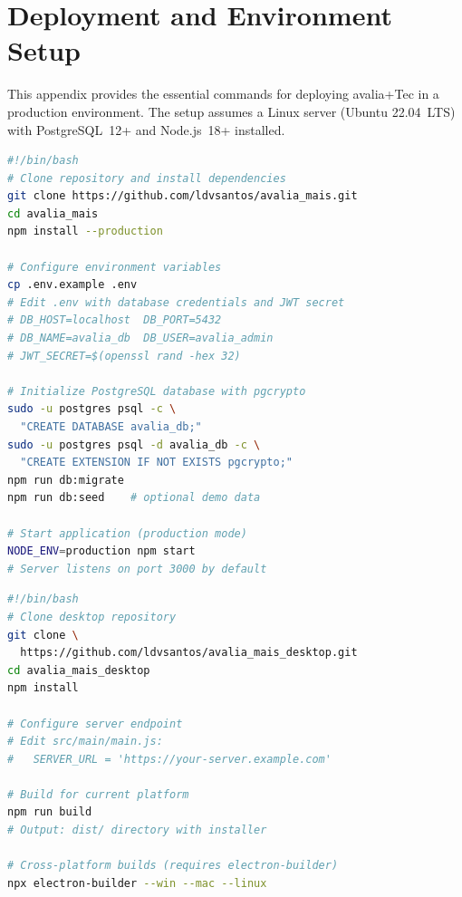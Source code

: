 \documentclass[preprint,12pt,a4paper]{elsarticle}
\begin{document}
\appendix

\section{Deployment and Environment Setup}
\label{app:deployment}

This appendix provides the essential commands for deploying avalia+Tec in a production environment. The setup assumes a Linux server (Ubuntu 22.04~LTS) with PostgreSQL~12+ and Node.js~18+ installed.

\begin{lstlisting}[language=sh, caption={Server-side deployment of the avalia+Tec backend and web portal. The script clones the repository, installs dependencies, configures the database, and starts the application.}, label=lst:deploy]
#!/bin/bash
# Clone repository and install dependencies
git clone https://github.com/ldvsantos/avalia_mais.git
cd avalia_mais
npm install --production

# Configure environment variables
cp .env.example .env
# Edit .env with database credentials and JWT secret
# DB_HOST=localhost  DB_PORT=5432
# DB_NAME=avalia_db  DB_USER=avalia_admin
# JWT_SECRET=$(openssl rand -hex 32)

# Initialize PostgreSQL database with pgcrypto
sudo -u postgres psql -c \
  "CREATE DATABASE avalia_db;"
sudo -u postgres psql -d avalia_db -c \
  "CREATE EXTENSION IF NOT EXISTS pgcrypto;"
npm run db:migrate
npm run db:seed    # optional demo data

# Start application (production mode)
NODE_ENV=production npm start
# Server listens on port 3000 by default
\end{lstlisting}

\begin{lstlisting}[language=sh, caption={Building the Electron desktop application for evaluators. Produces platform-specific installers for Windows, macOS, and Linux.}, label=lst:desktopbuild]
#!/bin/bash
# Clone desktop repository
git clone \
  https://github.com/ldvsantos/avalia_mais_desktop.git
cd avalia_mais_desktop
npm install

# Configure server endpoint
# Edit src/main/main.js:
#   SERVER_URL = 'https://your-server.example.com'

# Build for current platform
npm run build
# Output: dist/ directory with installer

# Cross-platform builds (requires electron-builder)
npx electron-builder --win --mac --linux
\end{lstlisting}



\end{document}
